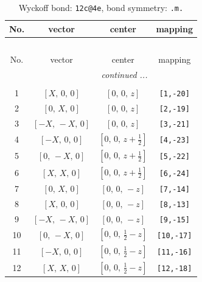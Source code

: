 \documentclass[fleqn,8pt]{jsarticle}
\begin{document}
\renewcommand{\arraystretch}{1.2}
\begin{longtable}{cccc}
\caption{Wyckoff bond: {\tt 12c@4e}, bond symmetry: {\tt .m.}}
 \\
 \hline \hline
No. & vector & center & mapping \\ \hline \endfirsthead

\multicolumn{3}{l}{\tablename\ \thetable{}} \\
 \hline \hline
No. & vector & center & mapping \\ \hline \endhead

 \hline \hline
\multicolumn{3}{r}{\footnotesize\it continued ...} \\ \endfoot

 \hline \hline
\multicolumn{3}{r}{} \\ \endlastfoot

1 & $\left[ X,\, 0,\, 0 \right]$ & $\left[ 0,\, 0,\, z \right]$ & {\tt [1,-20]} \\ \hline
2 & $\left[ 0,\, X,\, 0 \right]$ & $\left[ 0,\, 0,\, z \right]$ & {\tt [2,-19]} \\ \hline
3 & $\left[ - X,\, - X,\, 0 \right]$ & $\left[ 0,\, 0,\, z \right]$ & {\tt [3,-21]} \\ \hline
4 & $\left[ - X,\, 0,\, 0 \right]$ & $\left[ 0,\, 0,\, z + \frac{1}{2} \right]$ & {\tt [4,-23]} \\ \hline
5 & $\left[ 0,\, - X,\, 0 \right]$ & $\left[ 0,\, 0,\, z + \frac{1}{2} \right]$ & {\tt [5,-22]} \\ \hline
6 & $\left[ X,\, X,\, 0 \right]$ & $\left[ 0,\, 0,\, z + \frac{1}{2} \right]$ & {\tt [6,-24]} \\ \hline
7 & $\left[ 0,\, X,\, 0 \right]$ & $\left[ 0,\, 0,\, - z \right]$ & {\tt [7,-14]} \\ \hline
8 & $\left[ X,\, 0,\, 0 \right]$ & $\left[ 0,\, 0,\, - z \right]$ & {\tt [8,-13]} \\ \hline
9 & $\left[ - X,\, - X,\, 0 \right]$ & $\left[ 0,\, 0,\, - z \right]$ & {\tt [9,-15]} \\ \hline
10 & $\left[ 0,\, - X,\, 0 \right]$ & $\left[ 0,\, 0,\, \frac{1}{2} - z \right]$ & {\tt [10,-17]} \\ \hline
11 & $\left[ - X,\, 0,\, 0 \right]$ & $\left[ 0,\, 0,\, \frac{1}{2} - z \right]$ & {\tt [11,-16]} \\ \hline
12 & $\left[ X,\, X,\, 0 \right]$ & $\left[ 0,\, 0,\, \frac{1}{2} - z \right]$ & {\tt [12,-18]} \\
\end{longtable}
\end{document}
